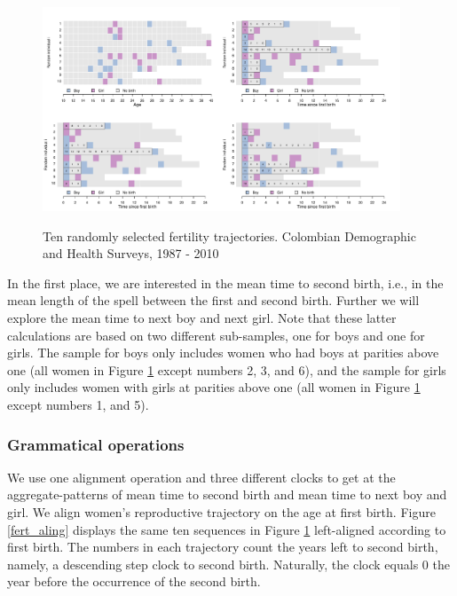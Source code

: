 \documentclass[a4paper,left=1.25cm,right=1.25cm,top=1.25cm,bottom=1.25cm]{article}
\begin{document}
\begin{figure}[H]
\centering
    \includegraphics[trim=0cm 10cm 18cm 1cm, clip, width=0.95\textwidth]{Figures/colombia/illu_fertility.pdf}\\
    \caption{Ten randomly selected fertility trajectories. Colombian Demographic and Health Surveys, 1987 - 2010}
    \label{fert_illu}
\end{figure}

In the first place, we are interested in the mean time to second birth, i.e., in the mean length of the spell between the first and second birth. Further we will explore the mean time to next boy and next girl. Note that these latter calculations are based on two different sub-samples, one for boys and one for girls. The sample for boys only includes women who had boys at parities above one (all women in Figure \ref{fert_illu} except numbers 2, 3, and 6), and the sample for girls only includes women with girls at parities above one (all women in Figure \ref{fert_illu} except numbers 1, and 5). %


\subsubsection{Grammatical operations}

We use one alignment operation and three different clocks to get at the aggregate-patterns of mean time to second birth and mean time to next boy and girl. We align women's reproductive trajectory on the age at first birth. Figure \ref{fert_aling} displays the same ten sequences in Figure \ref{fert_illu} left-aligned according to first birth. The numbers in each trajectory count the years left to second birth, namely, a descending step clock to second birth. Naturally, the clock equals 0 the year before the occurrence of the second birth.\\
\end{document}
